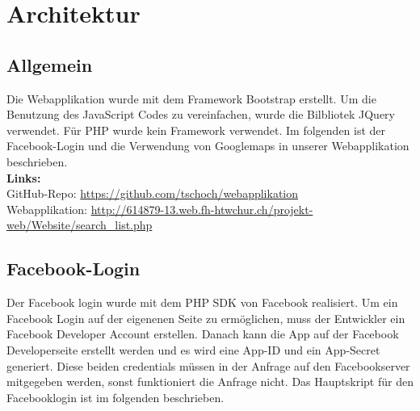 \documentclass[11pt,a4paper]{scrreprt}
\begin{document}
\newpage
 


 
 

\chapter{Architektur}
\section{Allgemein}
Die Webapplikation wurde mit dem Framework Bootstrap erstellt.
Um die Benutzung des JavaScript Codes zu vereinfachen, wurde die Bilbliotek JQuery verwendet. Für PHP wurde kein Framework verwendet.
Im folgenden ist der Facebook-Login und die Verwendung von Googlemaps in unserer Webapplikation beschrieben.\\

\noindent
\textbf{Links:}\\
GitHub-Repo: \url{https://github.com/tschoch/webapplikation}\\
Webapplikation: \url{http://614879-13.web.fh-htwchur.ch/projekt-web/Website/search_list.php}

\section{Facebook-Login}
Der Facebook login wurde mit dem PHP SDK \cite{phpsdk} von Facebook realisiert.
Um ein Facebook Login auf der eigenenen Seite zu ermöglichen, muss der Entwickler ein Facebook Developer Account \cite{fbdeveloper} erstellen. Danach kann die App auf der Facebook Developerseite erstellt werden und es wird eine App-ID und ein App-Secret generiert. Diese beiden credentials müssen in der Anfrage auf den Facebookserver mitgegeben werden, sonst funktioniert die Anfrage nicht.
Das Hauptskript für den Facebooklogin ist im folgenden beschrieben.\\
\end{document}
